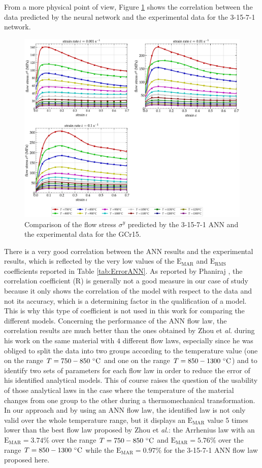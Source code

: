 \documentclass[algorithms,article,submit,pdftex,moreauthors]{Definitions/mdpi}
\makeatletter
\DeclareRobustCommand{\eal}{et \emph{al.}\@\xspace}
\DeclareRobustCommand{\RMSE}{\text{E}_\text{RMS}}
\DeclareRobustCommand{\MARE}{\text{E}_\text{MAR}}
\DeclareRobustCommand{\R}{\text{R}}
\makeatother
\begin{document}
From a more physical point of view, Figure \ref{fig:CompExpANN} shows the correlation between the data predicted by the neural network and the experimental data for the 3-15-7-1 network.
\begin{figure}[!ht]
\centering
\includegraphics[width=\columnwidth]{Figures/CompExpANN-3-15-7-1}
\caption{Comparison of the flow stress $\sigma^y$ predicted by the 3-15-7-1 ANN and the experimental data for the GCr15.}
\label{fig:CompExpANN}
\end{figure}
There is a very good correlation between the ANN results and the experimental results, which is reflected by the very low values of the $\MARE$ and $\RMSE$ coefficients reported in Table \ref{tab:ErrorANN}.
As reported by Phaniraj \cite{Phaniraj-2003}, the correlation coefficient ($\R$) is generally not a good measure in our case of study because it only shows the correlation of the model with respect to the data and not its accuracy, which is a determining factor in the qualification of a model.
This is why this type of coefficient is not used in this work for comparing the different models.
Concerning the performance of the ANN flow law, the correlation results are much better than the ones obtained by Zhou \eal \cite{Zhou-2020} during his work on the same material with $4$ different flow laws, especially since he was obliged to split the data into two groups according to the temperature value (one on the range $T=750-850~\celsius$ and one on the range $T=850-1300~\celsius$) and to identify two sets of parameters for each flow law in order to reduce the error of his identified analytical models.
This of course raises the question of the usability of those analytical laws in the case where the temperature of the material changes from one group to the other during a thermomechanical transformation.
In our approach and by using an ANN flow law, the identified law is not only valid over the whole temperature range, but it displays an $\MARE$ value $5$ times lower than the best flow law proposed by Zhou \eal \cite{Zhou-2020}: the Arrhenius law with an $\MARE=3.74\%$ over the range $T=750-850~\celsius$ and $\MARE=5.76\%$ over the range $T=850-1300~\celsius$ while the $\MARE=0.97\%$ for the 3-15-7-1 ANN flow law proposed here.
\end{document}
